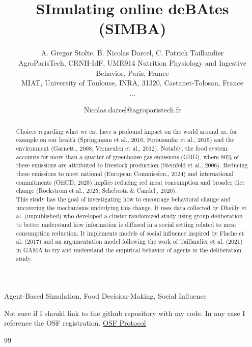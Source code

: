 \documentclass{gamadays}
\title{\textbf{SImulating online deBAtes (SIMBA)}}
\author{A. Gregor Stolte\up{1}, B. Nicolas Darcel\up{1}, C. Patrick Taillandier\up{2}\\[6pt]
\up{1} AgroParisTech, CRNH-IdF, UMR914 Nutrition Physiology and Ingestive Behavior, Paris, France\\
\up{2} MIAT, University of Toulouse, INRA, 31320, Castanet-Tolosan, France\\
...}
\date{Nicolas.darcel@agroparistech.fr}
\begin{document}
\maketitle


\begin{keywords}
Agent-Based Simulation, Food Decision-Making, Social Influence
\end{keywords}

\begin{abstract}
Choices regarding what we eat have a profound impact on the world around us, for example on our health (Springmann et al., 2016; Forouzanfar et al., 2015) and the environment (Garnett., 2008; Vermeulen et al., 2012). Notably, the food system accounts for more than a quarter of greenhouse gas emissions (GHG), where 80\% of these emissions are attributed to livestock production (Steinfeld et al., 2006). Reducing these emissions to meet national (European Commission., 2024) and international commitments (OECD, 2025) implies reducing red meat consumption and broader diet change (Rockström et al., 2025; Schebesta \& Candel., 2020).\\

This study has the goal of investigating how to encourage behavioral change and uncovering the mechanisms underlying this change. It uses data collected by Dheilly et al. (unpublished) who developed a cluster-randomized study using group deliberation to better understand how information is diffused in a social setting related to meat consumption reduction. It implements models of social influence inspired by Flache et al. (2017) and an argumentation model following the work of Taillandier et al. (2021) in GAMA to try and understand the empirical behavior of agents in the deliberation study. 
\end{abstract}

\begin{additionnalMaterial}
Not sure if I should link to the github repository with my code. In any case I reference the OSF registration.
\href{https://osf.io/nfue6/overview}{OSF Protocol}
\end{additionnalMaterial}

\begin{thebibliography}{99}
	













\end{thebibliography}
\end{document}
